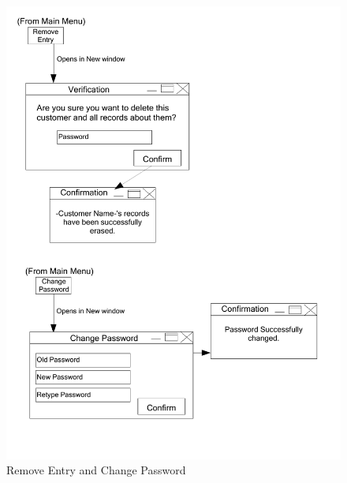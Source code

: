\begin{figure}[H]
    \caption{Remove Entry and Change Password} \label{Remove_Entry_and_Change_Password.pdf}
    \includegraphics[width=\textwidth]{./Design/UserInterfaceDesign/Remove_Entry_and_Change_Password.pdf}
\end{figure}


